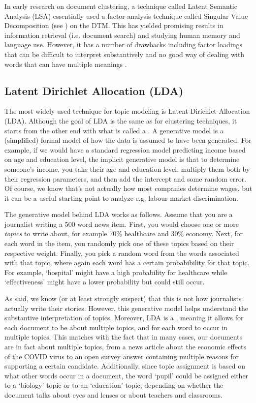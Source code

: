 In early research on document clustering, a technique called Latent Semantic Analysis (LSA) essentially used a factor analysis technique called Singular Value Decomposition (see ) on the DTM.
This has yielded promising results in information retrieval (i.e. document search) and studying human memory and language use.
However, it has a number of drawbacks including factor loadings that can be difficult to interpret substantively and no good way of dealing with words that can have multiple meanings \citep{lsa}.

\subsection{Latent Dirichlet Allocation (LDA)}

The most widely used technique for topic modeling is Latent Dirichlet Allocation (LDA).
Although the goal of LDA is the same as for clustering techniques, it starts from the other end with what is called a .
A generative model is a (simplified) formal model of how the data is assumed to have been generated.
For example, if we would have a standard regression model predicting income based on age and education level,
the implicit generative model is that to determine someone's income, you take their age and education level,
multiply them both by their regression parameters, and then add the intercept and some random error.
Of course, we know that's not actually how most companies determine wages, but it can be a useful starting point to analyze e.g. labour market discrimination.

The generative model behind LDA works as follows.
Assume that you are a journalist writing a 500 word news item.
First, you would choose one or more \emph{topics} to write about,
for example 70\% healthcare and 30\% economy.
Next, for each word in the item, you randomly pick one of these topics based on their respective weight.
Finally, you pick a random word from the words associated with that topic,
where again each word has a certain probabibility for that topic.
For example, `hospital' might have a high probability for healthcare while `effectiveness' might have a lower probability but could still occur.

As said, we know (or at least strongly suspect) that this is not how journalists actually write their stories.
However, this generative model helps understand the substantive interpretation of topics.
Moreover, LDA is a , meaning it allows for each document to be about multiple topics, and for each word to occur in multiple topics.
This matches with the fact that in many cases, our documents are in fact about multiple topics,
from a news article about the economic effects of the COVID virus to an open survey answer containing multiple reasons for supporting a certain candidate. 
Additionally, since topic assignment is based on what other words occur in a document,
the word `pupil' could be assigned either to a `biology' topic or to an `education' topic, depending
on whether the document talks about eyes and lenses or about teachers and classrooms.

